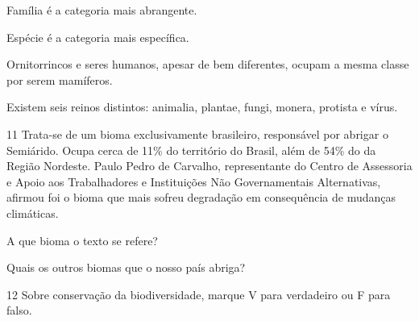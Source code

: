\begin{boxlist}
\item Família é a categoria mais abrangente. 

\item Espécie é a categoria mais específica. 

\item Ornitorrincos e seres humanos, apesar de bem diferentes, ocupam a
mesma classe por serem mamíferos. 

\item Existem seis reinos distintos: animalia, plantae, fungi, monera,
protista e vírus. 
\end{boxlist}

\num{11}  Trata-se de um bioma exclusivamente brasileiro, responsável por abrigar o Semiárido. 
  Ocupa cerca de 11\% do território do Brasil, além de 54\% do da Região
  Nordeste. Paulo
  Pedro de Carvalho, representante do Centro de Assessoria e Apoio aos
  Trabalhadores e Instituições Não Governamentais Alternativas, afirmou foi o bioma que mais sofreu
  degradação em consequência de mudanças climáticas.


\begin{escolha}
\item A que bioma o texto se refere?



\item Quais os outros biomas que o nosso país abriga?


\end{escolha}

\num{12}  Sobre conservação da biodiversidade, marque V para verdadeiro ou F para falso.

